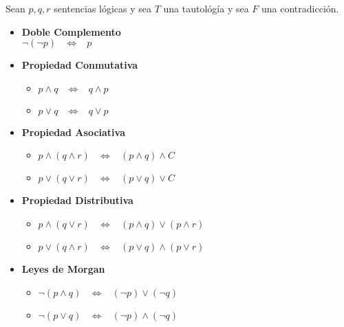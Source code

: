 \documentclass[12pt, fleqn]{report}                             %
\DeclareMathOperator \Space {\quad}                             %
\DeclareMathOperator \MiniSpace {\;}                            %
\newcommand \lequal {\MiniSpace \Leftrightarrow \MiniSpace}     %
\begin{document}
                Sean $p, q, r$ sentencias lógicas y sea $T$ una tautológía y sea $F$ una contradicción.

                \begin{itemize}
                    \item \textbf{Doble Complemento} \\
                            $\lnot(\lnot p) \lequal p$

                    \item \textbf{Propiedad Conmutativa}
                        \begin{itemize}
                            \item $p \land q \lequal q \land p$
                            \item $p \lor  q \lequal q \lor  p$
                        \end{itemize}

                    \item \textbf{Propiedad Asociativa}
                        \begin{itemize}
                            \item $p \land (q \land r) \lequal (p \land q) \land C$
                            \item $p \lor (q \lor r) \lequal (p \lor q) \lor C$
                        \end{itemize}

                    \item \textbf{Propiedad Distributiva}
                        \begin{itemize}
                            \item $p \land (q \lor r) \lequal (p \land q) \lor (p \land r)$
                            \item $p \lor (q \land r) \lequal (p \lor q) \land (p \lor r)$
                        \end{itemize}

                    \item \textbf{Leyes de Morgan}
                        \begin{itemize}
                            \item $\lnot (p \land q) \lequal (\lnot p) \lor (\lnot q)$
                            \item $\lnot (p \lor q) \lequal (\lnot p) \land (\lnot q)$
                        \end{itemize}

                    \clearpage


\end{itemize}
\end{document}
